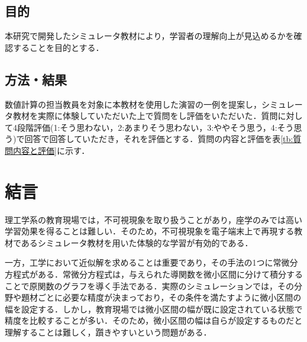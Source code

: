\documentclass[a4paper, 12pt]{ltjsarticle}
\begin{document}
\subsection{目的}
本研究で開発したシミュレータ教材により，学習者の理解向上が見込めるかを確認することを目的とする．
\subsection{方法・結果}
数値計算の担当教員を対象に本教材を使用した演習の一例を提案し，シミュレータ教材を実際に体験していただいた上で質問をし評価をいただいた．質問に対して4段階評価(1:そう思わない，2:あまりそう思わない，3:ややそう思う，4:そう思う)で回答で回答していただき，それを評価とする．質問の内容と評価を表\ref{tb:質問内容と評価}に示す．

\begin{table}[htbp]
\centering
\caption{質問内容と評価}
\label{tb:質問内容と評価}
\end{table}


\clearpage
\section{結言}
理工学系の教育現場では，不可視現象を取り扱うことがあり，座学のみでは高い学習効果を得ることは難しい．そのため，不可視現象を電子端末上で再現する教材であるシミュレータ教材を用いた体験的な学習が有効的である\cite{suda2018}．

一方，工学において近似解を求めることは重要であり，その手法の1つに常微分方程式がある．常微分方程式は，与えられた導関数を微小区間に分けて積分することで原関数のグラフを導く手法である．実際のシミュレーションでは，その分野や題材ごとに必要な精度が決まっており，その条件を満たすように微小区間の幅を設定する．しかし，教育現場では微小区間の幅が既に設定されている状態で精度を比較することが多い．そのため，微小区間の幅は自らが設定するものだと理解することは難しく，躓きやすいという問題がある．
\end{document}
